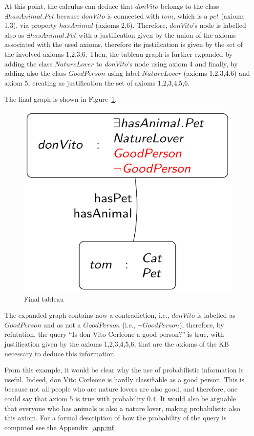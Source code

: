 At this point, the calculus can deduce that $donVito$ belongs to the class \linebreak $\exists hasAnimal.Pet$ because $donVito$ is connected with $tom$, which is a $pet$ (axioms {1,3}), via property $hasAnimal$ (axioms {2,6}). Therefore, $donVito$’s node is labelled also as $\exists hasAnimal.Pet$ with a justification given by the union of the axioms associated with the used axioms, therefore its justification is given by the set of the involved axioms {1,2,3,6}. Then, the tableau graph is further expanded by adding the class $NatureLover$ to $donVito$’s node using axiom 4 and finally, by adding also the class $GoodPerson$ using label $NatureLover$ (axioms {1,2,3,4,6}) and axiom 5, creating as justification the set of axioms {1,2,3,4,5,6}.

The final graph is shown in Figure~\ref{fig:tab2}.
\begin{figure}
	\centering
	\includegraphics[width=0.5\linewidth]{img/tab2}
	\caption{Final tableau}
	\label{fig:tab2}
\end{figure}
The expanded graph contains now a contradiction, i.e., $donVito$ is labelled as $GoodPerson$ and as not a $GoodPerson$ (i.e., $\neg GoodPerson$), therefore, by refutation, the query ``Is don Vito Corleone a good person?'' is true, with justification given by the axioms {1,2,3,4,5,6}, that are the axioms of the KB necessary to deduce this information.

From this example, it would be clear why the use of probabilistic information is useful. Indeed, don Vito Corleone is hardly classifiable as a good person. This is because not all people who are nature lovers are also good, and therefore, one could say that axiom 5 is true with probability 0.4. It would also be arguable that everyone who has animals is also a nature lover, making probabilistic also this axiom. For a formal description of how the probability of the query is computed see the Appendix~\ref{app:inf}.